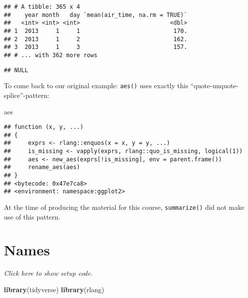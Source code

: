\documentclass[]{book}
\newenvironment{Shaded}{\begin{snugshade}}{\end{snugshade}}
\newcommand{\KeywordTok}[1]{\textcolor[rgb]{0.13,0.29,0.53}{\textbf{#1}}}
\newcommand{\NormalTok}[1]{#1}
\newcommand{\OperatorTok}[1]{\textcolor[rgb]{0.81,0.36,0.00}{\textbf{#1}}}
\newcommand{\StringTok}[1]{\textcolor[rgb]{0.31,0.60,0.02}{#1}}
\begin{document}
\begin{verbatim}
## # A tibble: 365 x 4
##    year month   day `mean(air_time, na.rm = TRUE)`
##   <int> <int> <int>                          <dbl>
## 1  2013     1     1                           170.
## 2  2013     1     2                           162.
## 3  2013     1     3                           157.
## # ... with 362 more rows
\end{verbatim}

\begin{Shaded}
\end{Shaded}

\begin{verbatim}
## NULL
\end{verbatim}

To come back to our original example: \texttt{aes()} uses exactly this ``quote-unquote-splice''-pattern:

\begin{Shaded}
\begin{Highlighting}[]
\NormalTok{aes}
\end{Highlighting}
\end{Shaded}

\begin{verbatim}
## function (x, y, ...) 
## {
##     exprs <- rlang::enquos(x = x, y = y, ...)
##     is_missing <- vapply(exprs, rlang::quo_is_missing, logical(1))
##     aes <- new_aes(exprs[!is_missing], env = parent.frame())
##     rename_aes(aes)
## }
## <bytecode: 0x47e7ca8>
## <environment: namespace:ggplot2>
\end{verbatim}

At the time of producing the material for this course, \texttt{summarize()} did not make use of this pattern.

\hypertarget{named}{%
\section{Names}\label{named}}

\emph{Click here to show setup code.}

\begin{Shaded}
\begin{Highlighting}[]
\KeywordTok{library}\NormalTok{(tidyverse)}
\KeywordTok{library}\NormalTok{(rlang)}
\end{Highlighting}
\end{Shaded}
\end{document}
